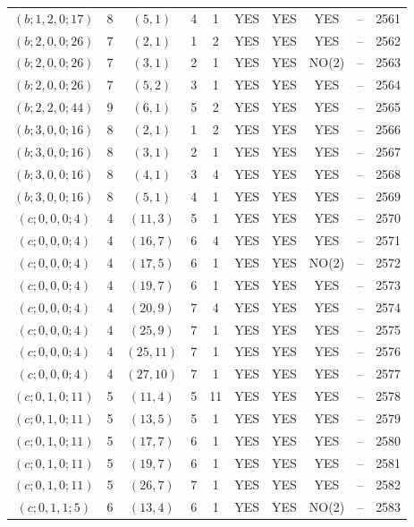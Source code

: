 \begin{longtable}{|c|c|c|c|c|c|c|c|c|c|}
$(b; 1, 2, 0; 17)$ & 8 & $(5, 1)$ & 4 & 1 & YES & YES & YES & -- & 2561\\
$(b; 2, 0, 0; 26)$ & 7 & $(2, 1)$ & 1 & 2 & YES & YES & YES & -- & 2562\\
$(b; 2, 0, 0; 26)$ & 7 & $(3, 1)$ & 2 & 1 & YES & YES & NO(2) & -- & 2563\\
$(b; 2, 0, 0; 26)$ & 7 & $(5, 2)$ & 3 & 1 & YES & YES & YES & -- & 2564\\
$(b; 2, 2, 0; 44)$ & 9 & $(6, 1)$ & 5 & 2 & YES & YES & YES & -- & 2565\\
$(b; 3, 0, 0; 16)$ & 8 & $(2, 1)$ & 1 & 2 & YES & YES & YES & -- & 2566\\
$(b; 3, 0, 0; 16)$ & 8 & $(3, 1)$ & 2 & 1 & YES & YES & YES & -- & 2567\\
$(b; 3, 0, 0; 16)$ & 8 & $(4, 1)$ & 3 & 4 & YES & YES & YES & -- & 2568\\
$(b; 3, 0, 0; 16)$ & 8 & $(5, 1)$ & 4 & 1 & YES & YES & YES & -- & 2569\\
$(c; 0, 0, 0; 4)$ & 4 & $(11, 3)$ & 5 & 1 & YES & YES & YES & -- & 2570\\
$(c; 0, 0, 0; 4)$ & 4 & $(16, 7)$ & 6 & 4 & YES & YES & YES & -- & 2571\\
$(c; 0, 0, 0; 4)$ & 4 & $(17, 5)$ & 6 & 1 & YES & YES & NO(2) & -- & 2572\\
$(c; 0, 0, 0; 4)$ & 4 & $(19, 7)$ & 6 & 1 & YES & YES & YES & -- & 2573\\
$(c; 0, 0, 0; 4)$ & 4 & $(20, 9)$ & 7 & 4 & YES & YES & YES & -- & 2574\\
$(c; 0, 0, 0; 4)$ & 4 & $(25, 9)$ & 7 & 1 & YES & YES & YES & -- & 2575\\
$(c; 0, 0, 0; 4)$ & 4 & $(25, 11)$ & 7 & 1 & YES & YES & YES & -- & 2576\\
$(c; 0, 0, 0; 4)$ & 4 & $(27, 10)$ & 7 & 1 & YES & YES & YES & -- & 2577\\
$(c; 0, 1, 0; 11)$ & 5 & $(11, 4)$ & 5 & 11 & YES & YES & YES & -- & 2578\\
$(c; 0, 1, 0; 11)$ & 5 & $(13, 5)$ & 5 & 1 & YES & YES & YES & -- & 2579\\
$(c; 0, 1, 0; 11)$ & 5 & $(17, 7)$ & 6 & 1 & YES & YES & YES & -- & 2580\\
$(c; 0, 1, 0; 11)$ & 5 & $(19, 7)$ & 6 & 1 & YES & YES & YES & -- & 2581\\
$(c; 0, 1, 0; 11)$ & 5 & $(26, 7)$ & 7 & 1 & YES & YES & YES & -- & 2582\\
$(c; 0, 1, 1; 5)$ & 6 & $(13, 4)$ & 6 & 1 & YES & YES & NO(2) & -- & 2583\\

\end{longtable}
